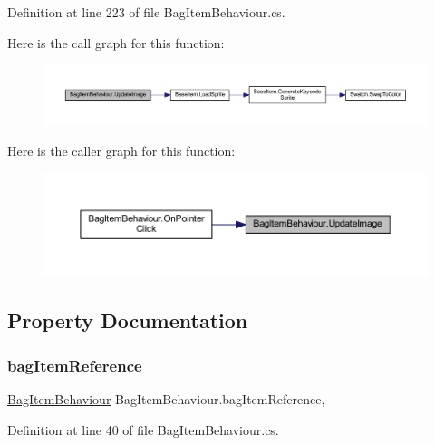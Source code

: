 Definition at line 223 of file Bag\+Item\+Behaviour.\+cs.

Here is the call graph for this function\+:
\nopagebreak
\begin{figure}[H]
\begin{center}
\leavevmode
\includegraphics[width=350pt]{class_bag_item_behaviour_aaedcc49f5d2def63dcde17d72fdb3b9d_cgraph}
\end{center}
\end{figure}
Here is the caller graph for this function\+:
\nopagebreak
\begin{figure}[H]
\begin{center}
\leavevmode
\includegraphics[width=350pt]{class_bag_item_behaviour_aaedcc49f5d2def63dcde17d72fdb3b9d_icgraph}
\end{center}
\end{figure}


\subsection{Property Documentation}
\mbox{\label{class_bag_item_behaviour_a804cf27502bc5bb77a2fa80e178903db}} 
\subsubsection{\texorpdfstring{bagItemReference}{bagItemReference}}
{\footnotesize\ttfamily \mbox{\hyperlink{class_bag_item_behaviour}{Bag\+Item\+Behaviour}} Bag\+Item\+Behaviour.\+bag\+Item\+Reference\hspace{0.3cm}{\ttfamily [get]}, {\ttfamily [set]}}



Definition at line 40 of file Bag\+Item\+Behaviour.\+cs.

